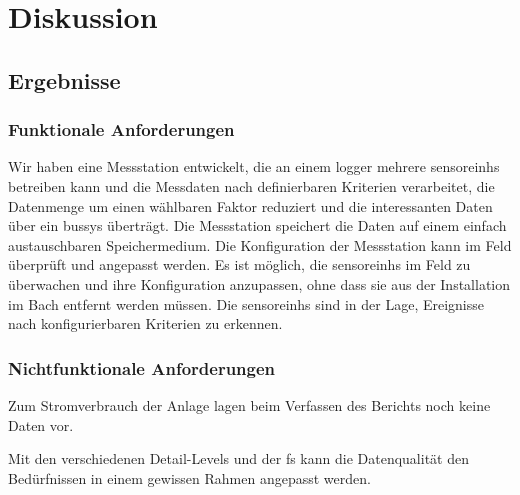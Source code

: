 %
%

\chapter{Diskussion}\label{chap.diskussion}


\section{Ergebnisse}
\subsection{Funktionale Anforderungen}
Wir haben eine Messstation entwickelt, die an einem \gls{logger} mehrere \glspl{sensoreinh} betreiben kann und die Messdaten nach definierbaren Kriterien verarbeitet, die Datenmenge um einen wählbaren Faktor reduziert und die interessanten Daten über ein \gls{bussys} überträgt. Die Messstation speichert die Daten auf einem einfach austauschbaren Speichermedium. Die Konfiguration der Messstation kann im Feld überprüft und angepasst werden. Es ist möglich, die \glspl{sensoreinh} im Feld zu überwachen und ihre Konfiguration anzupassen, ohne dass sie aus der Installation im Bach entfernt werden müssen. Die \glspl{sensoreinh} sind in der Lage, Ereignisse nach konfigurierbaren Kriterien zu erkennen.


\subsection{Nichtfunktionale Anforderungen}
Zum Stromverbrauch der Anlage lagen beim Verfassen des Berichts noch keine Daten vor.

Mit den verschiedenen Detail-Levels und der \gls{fs} kann die Datenqualität den Bedürfnissen in einem gewissen Rahmen angepasst werden.

